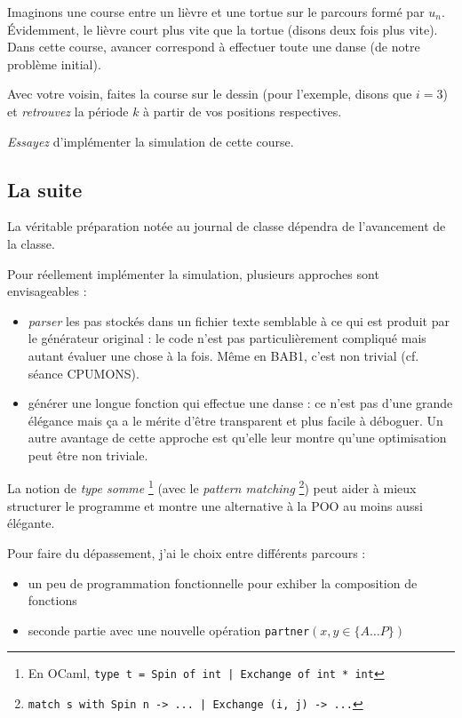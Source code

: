 Imaginons une course entre un lièvre et une tortue sur le parcours formé par
$u_n$. Évidemment, le lièvre court plus vite que la tortue (disons deux fois
plus vite). Dans cette course, avancer correspond à effectuer toute une danse
(de notre problème initial).

\begin{exo}
Avec votre voisin, faites la course sur le dessin (pour l'exemple, disons que
$i=3$) et \emph{retrouvez} la période $k$ à partir de vos positions respectives.
\end{exo}

\begin{exo}[Préparation]
\emph{Essayez} d'implémenter la simulation de cette course.
\end{exo}

\begin{teacheronly}
\section*{La suite}
La véritable préparation notée au journal de classe dépendra de l'avancement de
la classe.

Pour réellement implémenter la simulation, plusieurs approches sont
envisageables :
\begin{itemize}
\item \emph{parser} les pas stockés dans un fichier texte semblable à ce qui
	est produit par le générateur original : le code n'est pas particulièrement
	compliqué mais autant évaluer une chose à la fois. Même en BAB1, c'est non
	trivial (cf. séance CPUMONS).
\item générer une longue fonction qui effectue une danse : ce n'est pas d'une
	grande élégance mais ça a le mérite d'être transparent et plus facile à
	déboguer. Un autre avantage de cette approche est qu'elle leur montre
	qu'une optimisation peut être non triviale.
\end{itemize}

La notion de \emph{type somme}
\footnote{En OCaml, \texttt{type t = Spin of int | Exchange of int * int}}
(avec le \emph{pattern matching}
\footnote{\texttt{match s with Spin n -> ... | Exchange (i, j) -> ...}}) peut
aider à mieux structurer le programme et montre une alternative à la POO au
moins aussi élégante.

Pour faire du dépassement, j'ai le choix entre différents parcours :
\begin{itemize}
\item un peu de programmation fonctionnelle pour exhiber
	la composition de fonctions
\item seconde partie avec une nouvelle opération
	\texttt{partner}$(x, y\in\{A\dots P\})$
\end{itemize}
\end{teacheronly}


